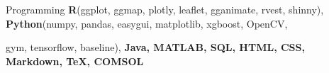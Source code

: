 

\begin{cvskills}



\cvskill
    {Programming} %
    {\textbf{R}(ggplot, ggmap, plotly, leaflet, gganimate, rvest, shinny), \textbf{Python}(numpy, pandas, easygui, matplotlib, xgboost, OpenCV, } %
    

 \cvskill
  {} %
   {gym, tensorflow, baseline), \textbf{Java, MATLAB, SQL, HTML, CSS, Markdown, \TeX, COMSOL}} %
   


    

\end{cvskills}
